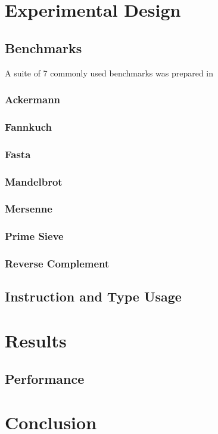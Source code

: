 \documentclass[english,a4paper]{article}
\begin{document}
\section{Experimental Design}

\subsection{Benchmarks}

A suite of 7 commonly used benchmarks was prepared in 

\subsubsection{Ackermann}
\subsubsection{Fannkuch}
\subsubsection{Fasta}
\subsubsection{Mandelbrot}
\subsubsection{Mersenne}
\subsubsection{Prime Sieve}
\subsubsection{Reverse Complement}

\subsection{Instruction and Type Usage}


\section{Results}

\subsection{Performance}

\section{Conclusion}
\end{document}
